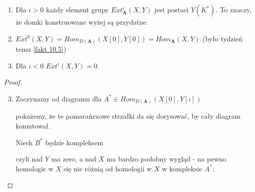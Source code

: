 \begin{theorem}$ $

  \begin{enumerate}[label=(\alph*)]
    \item Dla $i>0$ każdy element grupy $Ext_{\mathbf{A}}^i(X, Y)$ jest postaci $Y(K^*)$. To znaczy, że domki konstruowane wyżej są przydatne.
    \item $Ext^0(X, Y)=Hom_{D(\mathbf{A})}(X[0], Y[0])=Hom_{\mathbf{A}}(X, Y)$ (było tydzień temu \ref{fakt 10.5})
    \item Dla $i<0$ $Ext^i(X, Y)=0$.
  \end{enumerate}
\end{theorem}

\begin{proof}
  \begin{enumerate}[label=(\alph*)]
    \setcounter{enumi}{2}
    \item Zaczynamy od diagramu dla $A^*\in Hom_{D(\mathbf{A})}(X[0], Y[i])$
      \begin{center}\end{center}
      pokażemy, że te pomarańczowe strzałki da się dorysować, by cały diagram komutował.

      Niech $B^*$ będzie kompleksem
      \begin{center}\end{center}
      czyli nad $Y$ ma zero, a nad $X$ ma bardzo podobny wygląd - na pewno homologie w $X$ się nie różnią od homologii w $X$ w kompleksie $A^*$:

      \begin{center}\end{center}


\end{enumerate}
\end{proof}
